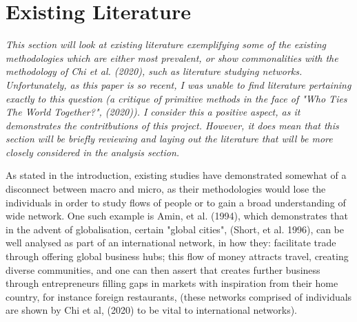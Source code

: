 \documentclass[12pt]{article}
\begin{document}
\section{Existing Literature}

\textit{
	This section will look at existing literature exemplifying some of the existing 
	methodologies which are either most prevalent, or show commonalities with the methodology 
	of Chi et al. (2020), such as literature studying networks. Unfortunately, as this paper is so recent, I was unable to find 
	literature pertaining exactly to this question (a critique of primitive methods in the 
	face of "Who Ties The World Together?", (2020)). I consider this a positive aspect, as 
	it demonstrates the contritbutions of this project. However, it does mean that this 
	section will be briefly reviewing and laying out the literature that will be more closely
	considered in the analysis section.
}

As stated in the introduction, existing studies have demonstrated somewhat of a disconnect 
between macro and micro, as their methodologies would lose the individuals in order to 
study flows of people or to gain a broad understanding of wide network. One such example 
is Amin, et al. (1994), which demonstrates that in the advent of globalisation, certain 
"global cities", (Short, et al. 1996), can be well analysed as part of an international 
network, in how they: facilitate trade through offering global business hubs; this flow 
of money attracts travel, creating diverse communities, and one can then assert that creates 
further business through entrepreneurs filling gaps in markets with inspiration from their 
home country, for instance foreign restaurants, (these networks comprised of individuals are shown by Chi et al, (2020) to 
be vital to international networks). 
\end{document}
